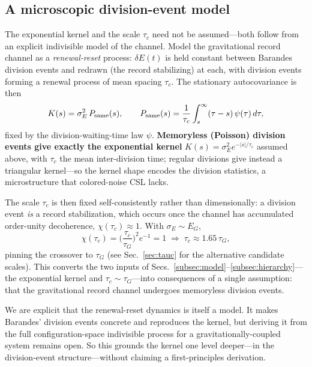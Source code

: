 \documentclass[aps,prd,onecolumn,amsmath,amssymb,nofootinbib,superscriptaddress]{revtex4-2}
\begin{document}
\subsection{A microscopic division-event model}\label{subsec:micro}

The exponential kernel and the scale $\tau_c$ need not be assumed---both follow from an explicit
indivisible model of the channel. Model the gravitational record channel as a \emph{renewal-reset}
process: $\delta E(t)$ is held constant between Barandes division events and redrawn (the record
stabilizing) at each, with division events forming a renewal process of mean spacing $\tau_c$. The
stationary autocovariance is then
\begin{equation}
K(s) = \sigma_E^2\,P_{\rm same}(s),\qquad
P_{\rm same}(s) = \frac{1}{\tau_c}\int_s^{\infty}(\tau-s)\,\psi(\tau)\,d\tau,
\end{equation}
fixed by the division-waiting-time law $\psi$. \textbf{Memoryless (Poisson) division events give
exactly the exponential kernel} $K(s)=\sigma_E^2 e^{-|s|/\tau_c}$ assumed above, with $\tau_c$ the mean
inter-division time; regular divisions give instead a triangular kernel---so the kernel shape encodes
the division statistics, a microstructure that colored-noise CSL lacks.

The scale $\tau_c$ is then fixed self-consistently rather than dimensionally: a division event
\emph{is} a record stabilization, which occurs once the channel has accumulated order-unity
decoherence, $\chi(\tau_c)\approx1$. With $\sigma_E\sim E_G$,
\begin{equation}
\chi(\tau_c)=\Big(\frac{\tau_c}{\tau_G}\Big)^2 e^{-1}=1 \;\Longrightarrow\; \tau_c\approx1.65\,\tau_G,
\tag{closure}
\end{equation}
pinning the crossover to $\tau_G$ (see Sec.~\ref{sec:tauc} for the alternative candidate scales). This
converts the two inputs of Secs.~\ref{subsec:model}--\ref{subsec:hierarchy}---the exponential kernel and
$\tau_c\sim\tau_G$---into consequences of a single assumption: that the gravitational record channel
undergoes memoryless division events.

We are explicit that the renewal-reset dynamics is itself a model. It makes Barandes' division events
concrete and reproduces the kernel, but deriving it from the full configuration-space indivisible
process for a gravitationally-coupled system remains open. So this grounds the kernel one level
deeper---in the division-event structure---without claiming a first-principles derivation.
\end{document}
